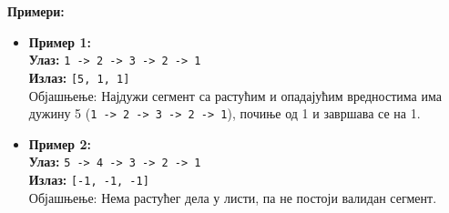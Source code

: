 \textbf{Примери:}
\begin{itemize}
    \item \textbf{Пример 1:} \\
          \textbf{Улаз:} \texttt{1 -> 2 -> 3 -> 2 -> 1} \\
          \textbf{Излаз:} \texttt{[5, 1, 1]} \\
          Објашњење: Најдужи сегмент са растућим и опадајућим вредностима има дужину 5 (\texttt{1 -> 2 -> 3 -> 2 -> 1}), почиње од 1 и завршава се на 1.
    \item \textbf{Пример 2:} \\
          \textbf{Улаз:} \texttt{5 -> 4 -> 3 -> 2 -> 1} \\
          \textbf{Излаз:} \texttt{[-1, -1, -1]} \\
          Објашњење: Нема растућег дела у листи, па не постоји валидан сегмент.
\end{itemize}

